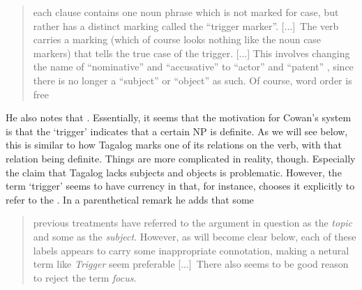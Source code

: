 \blockcquote{cowan1995}{each clause contains one noun phrase which is not
marked for case, but rather has a distinct marking called the \enquote{trigger
marker}. [...]\ The verb carries a marking (which of course looks nothing like
the noun case markers) that tells the true case of the trigger.
% 
%
[...]
%
This involves changing the name of \enquote{nominative} and
\enquote{accusative} to \enquote{actor} and \enquote{patent} \sic{}, since
there is no longer a \enquote{subject} or \enquote{object} as such. Of course,
word order is free
% 
}

He also notes that . Essentially, it seems that the motivation for
Cowan's system is that the `trigger' indicates that a certain NP is definite.
As we will see below, this is similar to how Tagalog marks one of its relations
on the verb, with that relation being definite. Things are more complicated in
reality, though. Especially the claim that Tagalog lacks subjects and objects
is problematic. However, the term `trigger' seems to have currency in that, for
instance, \citet{schachter2015} chooses it explicitly to refer to the
. In a parenthetical
remark he adds that some

\blockcquote[1659]{schachter2015}{previous treatments have referred to the
argument in question as the \emph{topic} and some as the \emph{subject}.
However, as will become clear below, each of these labels appears to carry some
inappropriate connotation, making a netural term like \emph{Trigger} seem
preferable [...]\ There also seems to be good reason to reject the term
\emph{focus}.}

